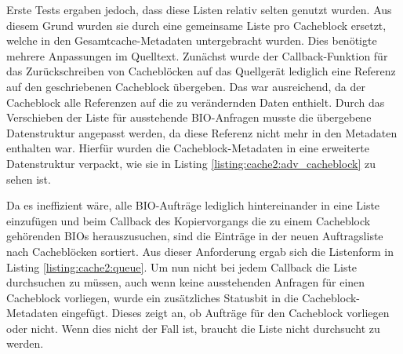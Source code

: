 Erste Tests ergaben jedoch, dass diese Listen relativ selten genutzt wurden. Aus diesem Grund wurden sie durch eine gemeinsame Liste pro Cacheblock ersetzt,
welche in den Gesamtcache-Metadaten untergebracht wurden. Dies benötigte mehrere Anpassungen im Quelltext. Zunächst wurde der Callback-Funktion für das
Zurückschreiben von Cache\-blö\-cken auf das Quellgerät lediglich eine Referenz auf den geschriebenen Cacheblock übergeben. Das war ausreichend, da der Cacheblock
alle Referenzen auf die zu verändernden Daten enthielt. Durch das Verschieben der Liste für ausstehende \ac{BIO}-Anfragen musste die übergebene Datenstruktur
angepasst werden, da diese Referenz nicht mehr in den Metadaten enthalten war. Hierfür wurden die Cacheblock-Metadaten in eine erweiterte Datenstruktur
verpackt, wie sie in Listing \ref{listing:cache2:adv_cacheblock} zu sehen ist.




Da es ineffizient wäre, alle \ac{BIO}-Aufträge lediglich hintereinander in eine Liste einzufügen und beim Callback des Kopiervorgangs die zu einem Cacheblock
gehörenden  \acp{BIO} herauszusuchen, sind die Einträge in der neuen Auftragsliste nach Cache\-blö\-cken sortiert. Aus dieser Anforderung ergab sich die
Listenform in Listing \ref{listing:cache2:queue}. Um nun nicht bei jedem Callback die Liste durchsuchen zu müssen, auch wenn keine ausstehenden Anfragen für einen
Cacheblock vorliegen, wurde ein zusätzliches Statusbit in die Cacheblock-Metadaten eingefügt. Dieses zeigt an, ob Aufträge für den Cacheblock vorliegen oder
nicht. Wenn dies nicht der Fall ist, braucht die Liste nicht durchsucht zu werden.



